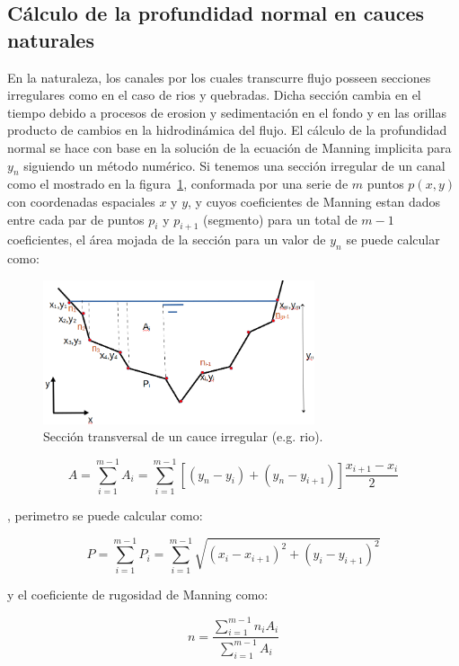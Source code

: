 \documentclass[11pt, oneside]{article}
\begin{document}
\subsection{C\'alculo de la profundidad normal en cauces naturales}
En la naturaleza, los canales por los cuales transcurre flujo posseen secciones irregulares como en el caso de rios y quebradas. Dicha secci\'on cambia en el tiempo debido a procesos de erosion y sedimentaci\'on en el fondo y en las orillas producto de cambios en la hidrodin\'amica del flujo. El c\'alculo de la profundidad normal se hace con base en la soluci\'on de la ecuaci\'on de Manning implicita para $y_n$ siguiendo un m\'etodo num\'erico. Si tenemos una secci\'on irregular de un canal como el mostrado en la figura~\ref{irre1}, conformada por una serie de $m$ puntos $p(x,y)$ con coordenadas espaciales $x$ y $y$, y cuyos coeficientes de Manning estan dados entre cada par de puntos $p_i$ y $p_{i+1}$ (segmento) para un total de $m-1$ coeficientes, el \'area mojada de la secci\'on para un valor de $y_n$ se puede calcular como:

\begin{figure}[h!]
\centering
\includegraphics[width=8cm]{irre1.png}
\caption{Secci\'on transversal de un cauce irregular (e.g. rio).}
\label{irre1}
\end{figure}


\begin{equation}
A = \sum_{i=1}^{m-1} A_i = \sum_{i=1}^{m-1} \left[ (y_n - y_i )+(y_n - y_{i+1}) \right] \frac{x_{i+1}-x_i }{2}
\label{irr1}
\end{equation}

, perimetro se puede calcular como:

\begin{equation}
P = \sum_{i=1}^{m-1} P_i = \sum_{i=1}^{m-1} \sqrt{ (x_i - x_{i+1} )^2 + (y_i - y_{i+1})^2 }
\label{irr2}
\end{equation}

y el coeficiente de rugosidad de Manning como:

\begin{equation}
n = \frac{\sum_{i=1}^{m-1} n_i A_i}{\sum_{i=1}^{m-1} A_i}
\label{irr3}
\end{equation}
\end{document}
